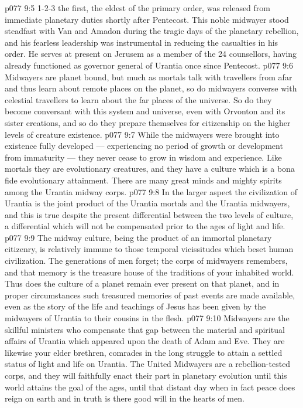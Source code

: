 \vs p077 9:5 1\hyp{}2\hyp{}3 the first, the eldest of the primary order, was released from immediate planetary duties shortly after Pentecost. This noble midwayer stood steadfast with Van and Amadon during the tragic days of the planetary rebellion, and his fearless leadership was instrumental in reducing the casualties in his order. He serves at present on Jerusem as a member of the 24 counsellors, having already functioned as governor general of Urantia once since Pentecost.
\vs p077 9:6 \pc Midwayers are planet bound, but much as mortals talk with travellers from afar and thus learn about remote places on the planet, so do midwayers converse with celestial travellers to learn about the far places of the universe. So do they become conversant with this system and universe, even with Orvonton and its sister creations, and so do they prepare themselves for citizenship on the higher levels of creature existence.
\vs p077 9:7 While the midwayers were brought into existence fully developed --- experiencing no period of growth or development from immaturity --- they never cease to grow in wisdom and experience. Like mortals they are evolutionary creatures, and they have a culture which is a bona fide evolutionary attainment. There are many great minds and mighty spirits among the Urantia midway corps.
\vs p077 9:8 In the larger aspect the civilization of Urantia is the joint product of the Urantia mortals and the Urantia midwayers, and this is true despite the present differential between the two levels of culture, a differential which will not be compensated prior to the ages of light and life.
\vs p077 9:9 The midway culture, being the product of an immortal planetary citizenry, is relatively immune to those temporal vicissitudes which beset human civilization. The generations of men forget; the corps of midwayers remembers, and that memory is the treasure house of the traditions of your inhabited world. Thus does the culture of a planet remain ever present on that planet, and in proper circumstances such treasured memories of past events are made available, even as the story of the life and teachings of Jesus has been given by the midwayers of Urantia to their cousins in the flesh.
\vs p077 9:10 Midwayers are the skillful ministers who compensate that gap between the material and spiritual affairs of Urantia which appeared upon the death of Adam and Eve. They are likewise your elder brethren, comrades in the long struggle to attain a settled status of light and life on Urantia. The United Midwayers are a rebellion\hyp{}tested corps, and they will faithfully enact their part in planetary evolution until this world attains the goal of the ages, until that distant day when in fact peace does reign on earth and in truth is there good will in the hearts of men.
